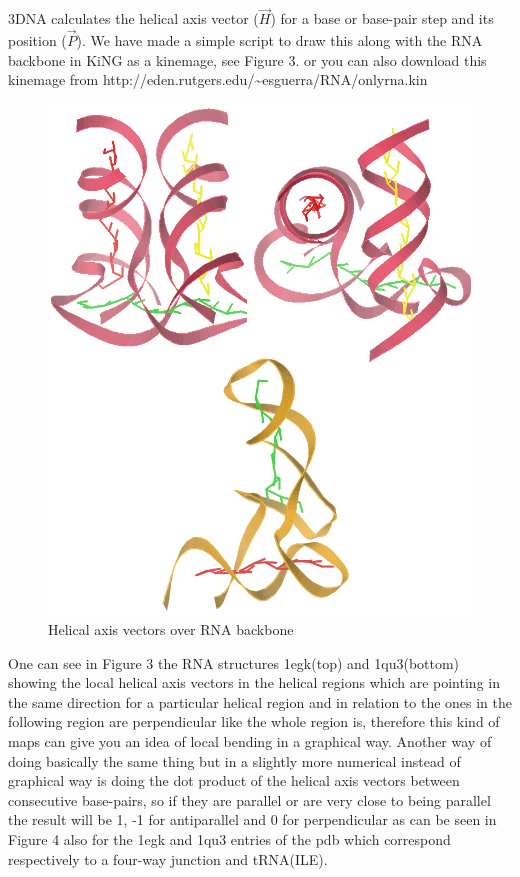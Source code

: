 3DNA calculates the helical axis  vector ($\vec{H}$) for a base or base-pair
step and  its position ($\vec{P}$).   We have made  a simple script  to draw
this along  with the RNA  backbone in KiNG  as a kinemage,  see Figure
3. or     you    can    also     download    this     kinemage    from
http://eden.rutgers.edu/\~{}esguerra/RNA/onlyrna.kin

\begin{figure}[htbp]
\centering
\includegraphics[scale=0.4]{both}
\caption{Helical axis vectors over RNA backbone}
\end{figure}

One can see in Figure  3 the RNA structures 1egk(top) and 1qu3(bottom)
showing the  local helical axis  vectors in the helical  regions which
are pointing in the same direction for a particular helical region and
in relation to the ones in the following region are perpendicular like
the whole region is, therefore this  kind of maps can give you an idea
of local  bending in a graphical  way. Another way  of doing basically
the same thing but in a slightly more numerical instead of graphical way
is doing  the dot product of the helical axis vectors
between consecutive base-pairs, so  if they
are parallel or are very close to being parallel the result will be 1,
-1 for antiparallel and 0 for perpendicular as can be seen in Figure 4
also for the 1egk and 1qu3 entries of the pdb which correspond respectively 
to a four-way junction and tRNA(ILE).


